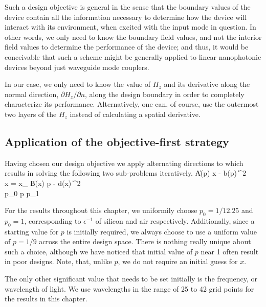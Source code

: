 
Such a design objective is general
    in the sense that the boundary values of the device 
    contain all the information necessary to determine
    how the device will interact with its environment,
    when excited with the input mode in question.
In other words,
    we only need to know the boundary field values,
    and not the interior field values to determine 
    the performance of the device;
    and thus, it would be conceivable that such a scheme
    might be generally applied to linear nanophotonic devices beyond 
    just waveguide mode couplers.

In our case,
    we only need to know the value of $H_z$ and 
    its derivative along the normal direction, $\partial H_z / \partial n$,
    along the design boundary
    in order to completely characterize its performance.
Alternatively,
    one can, of course, use the outermost two layers of the $H_z$
    instead of calculating a spatial derivative.

\subsection{Application of the objective-first strategy}
Having chosen our design objective we apply
    alternating directions to  which 
    results in solving the following two sub-problems iteratively.
\BA {} \| A(p) x - b(p) \|^2 \\
    \subto x = x_  \notag \EA
\BA {} \| B(x) p - d(x) \|^2 \\
    \subto p_0 \le p \le p_1 \notag \EA

For the results throughout this chapter, 
    we uniformily choose $p_0 = 1/12.25$ and $p_0 = 1$,
    corresponding to $\epsilon^{-1}$ of silicon and air respectively.
Additionally, since a starting value for $p$ is initially required,
    we always choose to use a uniform value of $p = 1/9$ 
    across the entire design space.
There is nothing really unique about such a choice,
    although we have noticed that initial value of $p$ near 1 
    often result in poor designs.
Note, that, unlike $p$, we do not require an initial guess for $x$.

The only other significant value that needs to be set initially
    is the frequency, or wavelength of light.
We use wavelengths in the range of 25 to 42 grid points for
    the results in this chapter.

